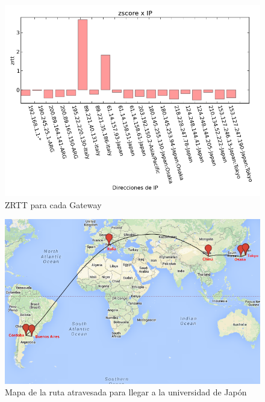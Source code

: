 \begin{figure}[H]
	\begin{center}
		  \includegraphics[scale=0.5]{../graficos_informe/jsc_zscore_segunda_medicion.png}
		  \caption{ZRTT para cada Gateway}
		  \label{fig:contra1}
	\end{center}
\end{figure}



\begin{figure}[H]
	\begin{center}
		  \includegraphics[scale=0.4]{../mapas/mapa_japon.png}
		  \caption{Mapa de la ruta atravesada para llegar a la universidad de Japón}
		  \label{fig:contra1}
	\end{center}
\end{figure}

